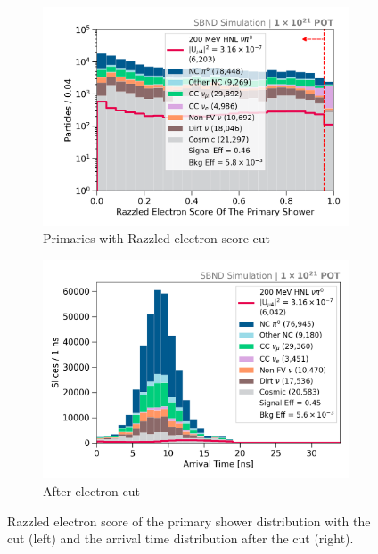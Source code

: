 \begin{figure}[b!]
        \begin{subfigure}[b]{0.495\textwidth}   
            \centering 
            \includegraphics[width=\textwidth]{razzled_electron_score_prim_shw_precut}
            \caption{Primaries with Razzled electron score cut}%
            \label{fig:nrazzled_electron_full}
        \end{subfigure}
        \hfill
        \begin{subfigure}[b]{0.495\textwidth}   
            \centering 
            \includegraphics[width=\textwidth]{beam_bucket_postelectron}
            \caption{After electron cut}%
            \label{fig:bb_post_electron}
        \end{subfigure}
	\caption[Electron Cut]{
		Razzled electron score of the primary shower distribution with the cut (left) and the arrival time distribution after the cut (right). 
	}
        \label{fig:razzled_electron_cut}
\end{figure}

